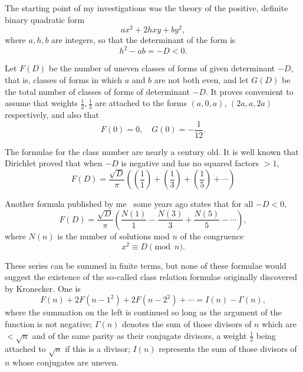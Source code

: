 \documentclass[12pt]{article}
\theoremstyle{remark}
\begin{document}
The starting point of my investigations was the theory of the positive, definite binary quadratic form
\begin{equation}\label{eq:binary_quadratic_form}
ax^2 + 2hxy + by^2,
\end{equation}
where $a, h, b$ are integers, so that the determinant of the form is
\begin{equation}\label{eq:determinant}
h^2 - ab = -D < 0.
\end{equation}

Let $F(D)$ be the number of uneven classes of forms of given determinant $-D$, that is, classes of forms in which $a$ and $b$ are not both even, and let $G(D)$ be the total number of classes of forms of determinant $-D$. It proves convenient to assume that weights $\frac{1}{2}, \frac{1}{3}$ are attached to the forms $(a, 0, a)$, $(2a, a, 2a)$ respectively, and also that
\begin{equation}\label{eq:F0_G0}
F(0) = 0, \quad G(0) = -\frac{1}{12}.
\end{equation}

The formulae for the class number are nearly a century old. It is well known that Dirichlet proved that when $-D$ is negative and has no squared factors $> 1$,
\begin{equation}\label{eq:dirichlet_formula}
F(D) = \frac{\sqrt{D}}{\pi} \left(\left(\frac{1}{1}\right) + \left(\frac{1}{3}\right) + \left(\frac{1}{5}\right) + \cdots\right)
\end{equation}

Another formula published by me~\cite{Mordell1916} some years ago states that for all $-D < 0$,
\begin{equation}\label{eq:mordell_formula}
F(D) = \frac{\sqrt{D}}{\pi} \left( \frac{N(1)}{1} - \frac{N(3)}{3} + \frac{N(5)}{5} - \cdots \right),
\end{equation}
where $N(n)$ is the number of solutions mod $n$ of the congruence
\begin{equation}\label{eq:congruence}
x^2 \equiv D \pmod{n}.
\end{equation}

These series can be summed in finite terms, but none of these formulae would suggest the existence of the so-called class relation formulae originally discovered by Kronecker. One is
\begin{equation}\label{eq:class_relation}
F(n) + 2F(n-1^2) + 2F(n-2^2) + \cdots = I(n) - \Gamma(n),
\end{equation}
where the summation on the left is continued so long as the argument of the function is not negative; $\Gamma(n)$ denotes the sum of those divisors of $n$ which are $< \sqrt{n}$ and of the same parity as their conjugate divisors, a weight $\frac{1}{2}$ being attached to $\sqrt{n}$ if this is a divisor; $I(n)$ represents the sum of those divisors of $n$ whose conjugates are uneven.
\end{document}
